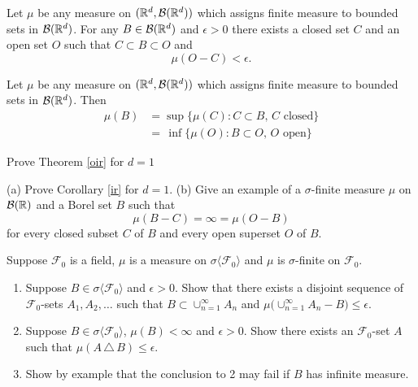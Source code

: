 \begin{theorem}[{\bf Regularity}]
\label{oir}
Let $\mu$ be any measure on $(\Bbb R^d,\mathcal B(\Bbb R^d))$ which assigns finite measure to bounded sets in $\mathcal B(\Bbb R^d)$.
For any  $B\in\mathcal B(\Bbb R^d)$ and $\epsilon>0$ there exists a closed set $C$ and an open set $O$ such that $C\subset B\subset O$ and
\[\mathcal \mu(O-C)<\epsilon.\]
\end{theorem}

\begin{corollary}
\label{ir}
Let $\mu$ be any measure on $(\Bbb R^d,\mathcal B(\Bbb R^d))$ which assigns finite measure to bounded sets in $\mathcal B(\Bbb R^d)$. Then
\begin{align*}
\mathcal \mu(B)  &= \sup \{ \mathcal \mu(C):  C\subset B,\, \text{$C$ closed}\}\\
  &=\, \inf \{ \mu(O):  B\subset O,\, \text{$O$ open}\}
\end{align*}
\end{corollary}




\begin{exercise}
Prove Theorem \ref{oir} for $d=1$
\end{exercise}




\begin{exercise}
(a) Prove Corollary \ref{ir} for $d=1$.
(b)
Give an example of a $\sigma$-finite measure $\mu$ on $\mathcal B(\Bbb R)$ and a Borel set $B$ such that
\[ \mu(B-C)= \infty = \mu(O-B) \]
for every closed subset $C$ of $B$ and every open superset $O$ of $B$.
\end{exercise}







\begin{exercise}
\label{l1}
Suppose  $\mathcal F_0$ is a field, $\mu$ is a measure on $\sigma\langle \mathcal F_0\rangle$ and $\mu$ is $\sigma$-finite on $\mathcal F_0$.
\begin{enumerate}
\item
Suppose $B\in \sigma\langle\mathcal F_0\rangle$ and $\epsilon>0$. Show that there exists a disjoint sequence of $\mathcal F_0$-sets $A_1, A_2,\ldots$ such that $B\subset \cup_{n=1}^\infty A_n$ and $ \mu\bigl( \cup_{n=1}^\infty A_n -
 B\bigr)\leq \epsilon$.
 \item Suppose $B\in \sigma\langle\mathcal F_0\rangle$, $\mu(B)<\infty$ and $\epsilon>0$. Show there exists an $\mathcal F_0$-set $A$ such that $\mu(A \,\triangle\, B)\leq \epsilon$.
\item Show by example that the conclusion to 2 may fail if $B$ has infinite measure.
 \end{enumerate}
\end{exercise}



